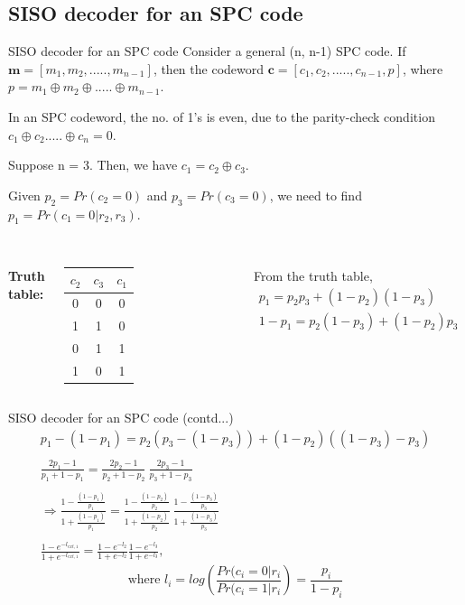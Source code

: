 \subsection{SISO decoder for an SPC code}
\begin{frame}{SISO decoder for an SPC code}
Consider a general (n, n-1) SPC code.
If $\textbf{m} = [m_1, m_2,....., m_{n-1}]$, then the codeword $\textbf{c} = [c_1, c_2,....., c_{n-1}, p]$, where $p = m_1 \oplus m_2 \oplus ..... \oplus m_{n-1}$.

In an SPC codeword, the no. of 1's is even, due to the parity-check condition $c_1 \oplus c_2 ..... \oplus c_n = 0$. 

Suppose n = 3. Then, we have $c_1 = c_2 \oplus c_3$. 

Given $p_2 = Pr(c_2 = 0)$ and $p_3 = Pr(c_3 = 0)$, we need to find $p_1 = Pr(c_1 = 0|r_2, r_3)$. \\~\\

\begin{columns}[T,onlytextwidth]
\textbf{Truth table:}
\begin{tabular}{cc|c}
$c_2$ & $c_3$ & $c_1$ \\
\hline
0 & 0 & 0 \\
1 & 1 & 0 \\
0 & 1 & 1 \\
1 & 0 & 1 \\
\end{tabular}

From the truth table,
\begin{equation*}
    \begin{split}
        p_1  = p_2p_3 + (1-p_2)(1-p_3) \\
        1 - p_1  =  p_2(1-p_3) + (1-p_2)p_3
    \end{split}
\end{equation*}
\end{columns}
\end{frame}

\begin{frame}{SISO decoder for an SPC code (contd...)}
\begin{gather*}
    p_1 - (1-p_1) = p_2(p_3-(1-p_3)) + (1-p_2)((1-p_3)-p_3) \\~\\
    \frac{2p_1 - 1}{p_1 + 1 - p_1} = \frac{2p_2 - 1}{p_2 + 1 - p_2} \ \frac{2p_3 - 1}{p_3 + 1 - p_3} \\~\\
    \Rightarrow \frac{1-\frac{(1-p_1)}{p_1}}{1+\frac{(1-p_1)}{p_1}} = \frac{1-\frac{(1-p_2)}{p_2}}{1+\frac{(1-p_2)}{p_2}} \ \frac{1-\frac{(1-p_3)}{p_3}}{1+\frac{(1-p_3)}{p_3}} \\~\\
    \frac{1 - e^{-l_{ext, 1}}}{1 + e^{-l_{ext, 1}}} = \frac{1 - e^{-l_2}}{1 + e^{-l_{2}}} \frac{1 - e^{-l_3}}{1 + e^{-l_{3}}},
\end{gather*}
\begin{equation*}\text{where }l_i = log \left(\frac{Pr(c_i = 0|r_i}{Pr(c_i = 1|r_i}\right) = \frac{p_i}{1-p_i}\end{equation*}
\end{frame}

